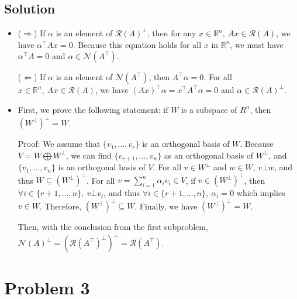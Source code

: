 \documentclass[11pt]{report}
\newcommand{\mc}{\mathcal}
\newcommand{\mb}{\mathbb}
\newcommand{\T}{\intercal}
\begin{document}
\subsection*{Solution}
\begin{itemize}
\item
($\Rightarrow$) If $\alpha$ is an element of $\mc{R}(A)^\bot$, then for any $x \in \mb{R}^n,~Ax \in \mc{R}(A)$, we have $\alpha^\T A x = 0$. Because this equation holds for all $x$ in $\mb{R}^n$, we must have $\alpha^\T A = 0$ and $\alpha \in \mc{N}(A^\T)$.

($\Leftarrow$) If $\alpha$ is an element of $\mc{N}(A^\T)$, then $A^\T \alpha = 0$. For all $x \in \mb{R}^n,~Ax \in \mc{R}(A)$, we have $(A x)^\T \alpha  = x^\T A^\T \alpha = 0$ and $\alpha \in \mc{R}(A)^\bot$.

\item
First, we prove the following statement: if $W$ is a subspace of $R^n$, then $(W^\bot)^\bot = W$.

Proof: We assume that $\{v_1, \ldots, v_r\}$ is an orthogonal basis of $W$. Because $V = W \bigoplus W^\bot$, we can find $\{v_{r+1}, \ldots, v_n\}$ as an orthogonal basis of $W^\bot$, and $\{v_1, \ldots, v_n\}$ is an orthogonal basis of $V$. For all $v \in W^\bot$ and $w \in W$, $v \bot w$, and thus $W \subseteq (W^\bot)^\bot$. For all $v = \sum_{i=1}^{n}\alpha_i v_i \in V$, if $v \in (W^\bot)^\bot$, then $\forall i \in \{r+1, \ldots, n\},~v \bot v_i$, and thus $\forall i \in \{r+1, \ldots, n\},~\alpha_i = 0$ which implies $v \in W$. Therefore, $(W^\bot)^\bot \subseteq W$. Finally, we have $(W^\bot)^\bot = W$.

Then, with the conclusion from the first subproblem, $\mc{N}(A)^\bot = (\mc{R}(A^\T)^\bot)^\bot = \mc{R}(A^\T)$.
\end{itemize}

\pagebreak
\section*{Problem 3}
\end{document}
